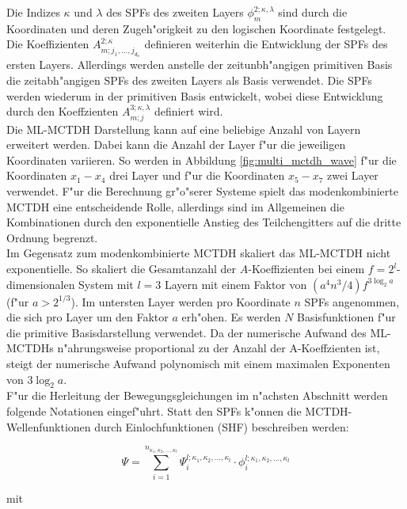 Die Indizes $\kappa$ und $\lambda$ des SPFs des zweiten Layers $ \phi^{2;\kappa, \lambda}_{m}  $  sind durch die Koordinaten und deren
Zugeh"origkeit zu den logischen Koordinate festgelegt.
Die Koeffizienten $A^{2;\kappa}_{m;j_1,...,j_{d_\kappa}}$ definieren weiterhin die Entwicklung der SPFs des ersten Layers.
Allerdings werden anstelle der zeitunbh"angigen primitiven Basis die zeitabh"angigen SPFs des zweiten Layers als Basis verwendet.
Die SPFs werden wiederum in der primitiven Basis entwickelt, wobei diese Entwicklung durch den Koeffzienten  $A^{3;\kappa, \lambda}_{m;j}$
definiert wird.
  \\Die ML-MCTDH Darstellung kann auf eine beliebige Anzahl von Layern erweitert werden.
Dabei kann die Anzahl der Layer f"ur die jeweiligen Koordinaten variieren.
So werden in Abbildung \ref{fig:multi_mctdh_wave} f"ur die Koordinaten $x_1-x_4$ drei Layer und f"ur die Koordinaten $x_5 - x_7$ zwei Layer verwendet.
F"ur die Berechnung gr"o"serer Systeme spielt das modenkombinierte MCTDH eine entscheidende Rolle, allerdings sind im Allgemeinen die Kombinationen
durch den exponentielle Anstieg des Teilchengitters auf die dritte Ordnung begrenzt. \cite{MCTDHreview3}
  \\Im Gegensatz zum modenkombinierte MCTDH skaliert das ML-MCTDH nicht exponentielle.
So skaliert die Gesamtanzahl der $A$-Koeffizienten bei einem $f=2^l$-dimensionalen System mit $l=3$ Layern mit einem Faktor von $(a^4n^{3}/4)f^{3\log_{2}a}$
(f"ur $a>2^{1/3}$). Im untersten Layer werden pro Koordinate $n$ SPFs angenommen, die sich pro Layer um den Faktor $a$ erh"ohen.
Es werden $N$ Basisfunktionen f"ur die primitive Basisdarstellung verwendet.
Da der numerische Aufwand des ML-MCTDHs n"ahrungsweise proportional zu der Anzahl der A-Koeffzienten ist, steigt der numerische Aufwand polynomisch
mit einem maximalen Exponenten von $3\log_{2}a$.\cite{Mreview2}
  \\F"ur die Herleitung der Bewegungsgleichungen im n"achsten Abschnitt werden folgende Notationen eingef"uhrt.
Statt den SPFs k"onnen die MCTDH-Wellenfunktionen durch Einlochfunktionen (SHF) \cite{Mreview2, MCTDHreview3} beschreiben werden:

 \begin{equation}
 \Psi=\sum^{n_{\kappa_1,\kappa_2,...,\kappa_l}}_{i=1} \Psi^{l;\kappa_1,\kappa_2,...,\kappa_l}_{i} \cdot  \phi^{l;\kappa_1,\kappa_2,...,\kappa_l}_{i}
 \label{Eq:MCTDH_SHF}
 \end{equation}

 mit

